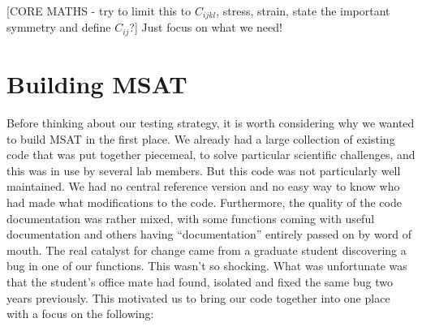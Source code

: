 \documentclass[11pt, oneside]{article}   	%
\begin{document}
[CORE MATHS - try to limit this to $C_{ijkl}$, stress, strain, state the important 
symmetry and define $C_{ij}$?] Just focus on what we need! 

\section{Building MSAT}

Before thinking about our testing strategy, it is worth  considering why
we wanted to build MSAT in the first place. We already had a large collection 
of existing code that was put together piecemeal, to solve particular scientific
challenges, and this was in use by several lab members. But this code was not
particularly well maintained. We had no central reference version and no easy
way to know who had made what modifications to the code. Furthermore, the 
quality of the code documentation was rather mixed, with some functions coming
with useful documentation and others having ``documentation'' entirely passed on
by word of mouth. The real catalyst for change came from a graduate student 
discovering a bug in one of our functions. This wasn't so shocking. What was 
unfortunate was that the student's office mate had found, isolated and fixed the
same bug two years previously. This motivated us to  
bring our code together into one place with a focus on the following:
\end{document}
